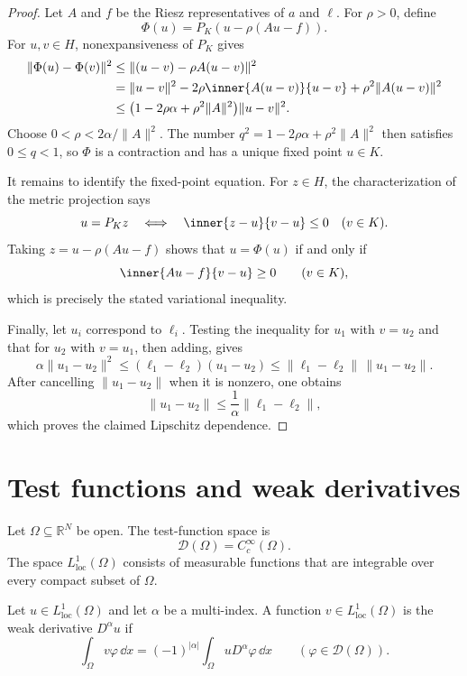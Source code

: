 \begin{proof}
Let $A$ and $f$ be the Riesz representatives of $a$ and $\ell$.  For
$\rho>0$, define
\[
  \Phi(u)=P_K(u-\rho(Au-f)).
\]
For $u,v\in H$, nonexpansiveness of $P_K$ gives
\begin{align*}
  \|\Phi(u)-\Phi(v)\|^2
  &\le
  \|(u-v)-\rho A(u-v)\|^2 \\
  &=\|u-v\|^2
    -2\rho\inner{A(u-v)}{u-v}
    +\rho^2\|A(u-v)\|^2 \\
  &\le
  \bigl(1-2\rho\alpha+\rho^2\|A\|^2\bigr)\|u-v\|^2.
\end{align*}
Choose $0<\rho<2\alpha/\|A\|^2$.  The number
$q^2=1-2\rho\alpha+\rho^2\|A\|^2$ then satisfies $0\le q<1$, so $\Phi$ is a
contraction and has a unique fixed point $u\in K$.

It remains to identify the fixed-point equation.  For $z\in H$, the
characterization of the metric projection says
\[
  u=P_Kz
  \quad\Longleftrightarrow\quad
  \inner{z-u}{v-u}\le0
  \quad(v\in K).
\]
Taking $z=u-\rho(Au-f)$ shows that $u=\Phi(u)$ if and only if
\[
  \inner{Au-f}{v-u}\ge0
  \qquad(v\in K),
\]
which is precisely the stated variational inequality.

Finally, let $u_i$ correspond to $\ell_i$.  Testing the inequality for $u_1$
with $v=u_2$ and that for $u_2$ with $v=u_1$, then adding, gives
\[
  \alpha\|u_1-u_2\|^2
  \le (\ell_1-\ell_2)(u_1-u_2)
  \le\|\ell_1-\ell_2\|\,\|u_1-u_2\|.
\]
After cancelling $\|u_1-u_2\|$ when it is nonzero, one obtains
\[
  \|u_1-u_2\|
  \le\frac1\alpha\|\ell_1-\ell_2\|,
\]
which proves the claimed Lipschitz dependence.
\end{proof}

\section{Test functions and weak derivatives}

\begin{notedefinition}
Let $\Omega\subseteq\mathbb R^N$ be open.  The test-function space is
\[
  \mathcal D(\Omega)=C_c^\infty(\Omega).
\]
The space $L^1_{\mathrm{loc}}(\Omega)$ consists of measurable functions that
are integrable over every compact subset of $\Omega$.
\end{notedefinition}

\begin{notedefinition}
Let $u\in L^1_{\mathrm{loc}}(\Omega)$ and let $\alpha$ be a multi-index.  A
function $v\in L^1_{\mathrm{loc}}(\Omega)$ is the weak derivative
$D^\alpha u$ if
\[
  \int_\Omega v\varphi\,\dd x
  =(-1)^{|\alpha|}
    \int_\Omega uD^\alpha\varphi\,\dd x
  \qquad(\varphi\in\mathcal D(\Omega)).
\]
\end{notedefinition}

